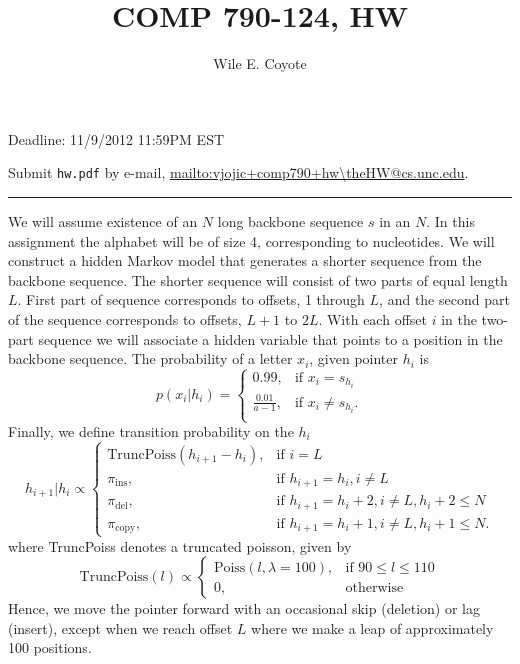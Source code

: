 \documentclass{article}
\begin{document}
\author{Wile E. Coyote}
\setcounter{HW}{3}
\title{COMP  790-124, HW\theHW}
\maketitle

{ Deadline: 11/9/2012 11:59PM EST}

{ Submit \texttt{hw\theHW.pdf} by e-mail,  \url{mailto:vjojic+comp790+hw\theHW@cs.unc.edu}}.


\noindent\rule{\textwidth}{3pt}
 We will assume existence of an $N$ long backbone sequence $s$ in an $N$. In this assignment the alphabet will be of size 4, corresponding to nucleotides. We will construct a hidden Markov model that generates a shorter sequence from the backbone sequence. The shorter sequence will consist of two parts of equal length $L$. First part of sequence corresponds to offsets, 1 through $L$, and the second part of the sequence corresponds to offsets, $L+1$ to $2L$. With each offset $i$ in the two-part sequence we will associate a hidden variable that points to a position in the backbone sequence.
 The probability of a letter $x_i$, given pointer $h_i$ is
 \[
 p(x_i|h_i) = \begin{cases}
 0.99,& \mbox{if } x_i = s_{h_i} \\
 \frac{0.01}{a - 1},& \mbox{if } x_i \neq s_{h_i}. \\
 \end{cases}
 \]
 Finally, we define transition probability on the $h_i$
 \[
h_{i+1}|h_i \propto
\begin{cases}
\textrm{TruncPoiss}(h_{i+1} - h_i), & \mbox{if } i = L\\
\pi_{\textrm{ins}}, &\mbox{if } h_{i+1} = h_i, i \neq L \\
\pi_{\textrm{del}}, & \mbox{if } h_{i+1} = h_i+2, i \neq L, h_i+2 \leq N \\
\pi_{\textrm{copy}}, &  \mbox{if } h_{i+1} = h_i+1,i \neq L, h_i+1 \leq N.
\end{cases}
\]
where TruncPoiss denotes a truncated poisson, given by
\[
\textrm{TruncPoiss}(l) \propto \begin{cases}
\textrm{Poiss}(l,\lambda=100), &\mbox{if } 90\leq l \leq 110 \\
0 , &\mbox{otherwise }
\end{cases}
\]
 Hence, we move the pointer forward with an occasional skip (deletion) or lag (insert), except when we reach offset $L$ where we make a leap of approximately 100 positions.
\end{document}
